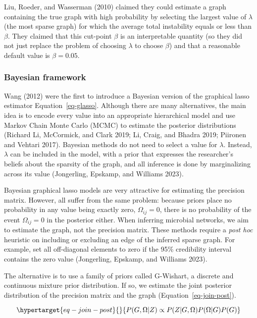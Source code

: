 \documentclass[
  a4paper,
]{article}
\begin{document}
Liu, Roeder, and Wasserman (2010) claimed they could estimate a graph
containing the true graph with high probability by selecting the largest
value of \(\lambda\) (the most sparse graph) for which the average total
instability equals or less than \(\beta\). They claimed that this
cut-point \(\beta\) is an interpretable quantity (so they did not just
replace the problem of choosing \(\lambda\) to choose \(\beta\)) and
that a reasonable default value is \(\beta = 0.05\).

\hypertarget{bayesian-framework}{%
\subsubsection{Bayesian framework}\label{bayesian-framework}}

Wang (2012) were the first to introduce a Bayesian version of the
graphical lasso estimator Equation~\ref{eq-glasso}. Although there are
many alternatives, the main idea is to encode every value into an
appropriate hierarchical model and use Markov Chain Monte Carlo (MCMC)
to estimate the posterior distributions (Richard Li, McCormick, and
Clark 2019; Li, Craig, and Bhadra 2019; Piironen and Vehtari 2017).
Bayesian methods do not need to select a value for \(\lambda\). Instead,
\(\lambda\) can be included in the model, with a prior that expresses
the researcher's beliefs about the sparsity of the graph, and all
inference is done by marginalizing across its value (Jongerling,
Epskamp, and Williams 2023).

Bayesian graphical lasso models are very attractive for estimating the
precision matrix. However, all suffer from the same problem: because
priors place no probability in any value being exactly zero,
\(\Omega_{ij}=0\), there is no probability of the event
\(\Omega_{ij}=0\) in the posterior either. When inferring microbial
networks, we aim to estimate the graph, not the precision matrix. These
methods require a \emph{post hoc} heuristic on including or excluding an
edge of the inferred sparse graph. For example, set all off-diagonal
elements to zero if the 95\% credibility interval contains the zero
value (Jongerling, Epskamp, and Williams 2023).

The alternative is to use a family of priors called G-Wishart, a
discrete and continuous mixture prior distribution. If so, we estimate
the joint posterior distribution of the precision matrix and the graph
(Equation~\ref{eq-join-post}).

\begin{equation}\protect\hypertarget{eq-join-post}{}{
P(G, \Omega|Z) \propto P(Z|G, \Omega) P(\Omega|G)P(G)
}\label{eq-join-post}\end{equation}
\end{document}
